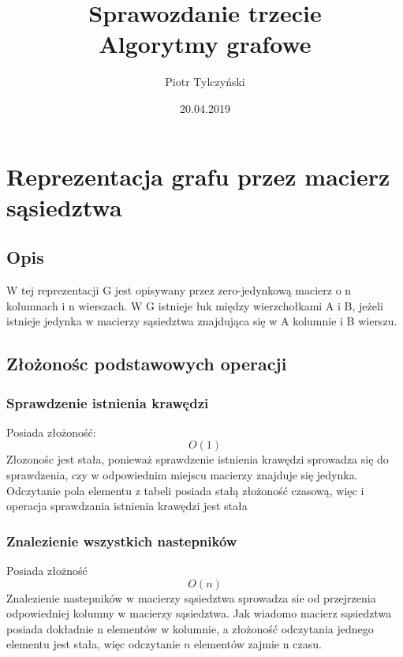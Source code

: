 \documentclass[]{article}
\title{{{\normalsize Sprawozdanie trzecie} \\
		{\huge Algorytmy grafowe}}}
\author{Piotr Tylczyński}
\date{20.04.2019}
\begin{document}
\renewcommand*\contentsname{Spis}
\maketitle
\tableofcontents
\clearpage

\section{Reprezentacja grafu przez macierz sąsiedztwa}
	\subsection{Opis}
		W tej reprezentacji \gls{G} jest opisywany przez zero-jedynkową macierz o \gls{n} kolumnach i \gls{n} wierszach. W \gls{G} istnieje łuk między wierzchołkami \gls{A} i \gls{B}, jeżeli istnieje jedynka w macierzy sąsiedztwa znajdująca się w \gls{A} kolumnie i \gls{B} wierszu.
	\subsection{Złożonośc podstawowych operacji}
		\subsubsection{Sprawdzenie istnienia krawędzi}
			Posiada złożoność:
			\begin{equation}
				O(1)
			\end{equation}
			Złozonośc jest stała, ponieważ sprawdzenie istnienia krawędzi sprowadza się do sprawdzenia, czy w odpowiednim miejscu macierzy znajduje się jedynka. Odczytanie pola elementu z tabeli posiada stałą złożoność czasową, więc i operacja sprawdzania istnienia krawędzi jest stała
		\subsubsection{Znalezienie wszystkich nastepników}
			Posiada złożność
			\begin{equation}
				O(n)
			\end{equation}
			Znalezienie nastepników w macierzy sąsiedztwa sprowadza sie od przejrzenia odpowiedniej kolumny w macierzy sąsiedztwa. Jak wiadomo macierz sąsiedztwa posiada dokładnie \gls{n} elementów w kolumnie, a złożoność odczytania jednego elementu jest stała, więc odczytanie $n$ elementów zajmie \gls{n} czasu.
\end{document}
